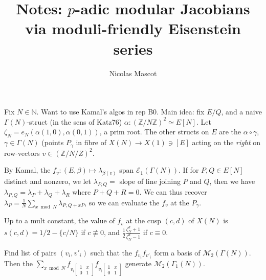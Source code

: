 \documentclass[12pt]{article}
\title{Notes: $p$-adic modular Jacobians via moduli-friendly Eisenstein series}
\author{Nicolas Mascot}
\newcommand{\N}{\mathbb{N}}
\newcommand{\Z}{\mathbb{Z}}
\newcommand{\M}{\mathcal{M}}
\newcommand{\E}{\mathcal{E}}
\newcommand{\smat}[4]{\left[ \begin{smallmatrix} #1 & #2 \\ #3 & #4 \end{smallmatrix} \right]}
\theoremstyle{definition}
\begin{document}
Fix $N \in \N$. Want to use Kamal's algos in rep B0. Main idea: fix $E/Q$, and a naive $\Gamma(N)$-struct (in the sens of Katz76) $\alpha: (\Z/N\Z)^2 \simeq E[N]$. Let $\zeta_N = e_N(\alpha(1,0),\alpha(0,1))$, a prim root. The other structs on $E$ are the $\alpha \circ \gamma$, $\gamma \in \Gamma(N)$ (points $P_\gamma$ in fibre of $X(N) \longrightarrow X(1) \ni [E]$ acting on the \emph{right} on row-vectors $v \in (\Z/N/Z)^2$.

By Kamal, the $f_v : (E,\beta) \mapsto \lambda_{\beta(v)}$ span $\E_1(\Gamma(N))$. If for $P,Q \in E[N]$ distinct and nonzero, we let $\lambda_{P,Q} = $ slope of line joining $P$ and $Q$, then we have $\lambda_{P,Q} = \lambda_P + \lambda_{Q} + \lambda_{R}$ where $P+Q+R=0$. We can thus recover $\lambda_P = \frac1N \sum_{x \bmod N} \lambda_{P,Q+xP}$, so we can evaluate the $f_v$ at the $P_\gamma$.

Up to a mult constant, the value of $f_v$ at the cusp $(c,d)$ of $X(N)$ is $s(c,d) = 1/2 - \{c/N\}$ if $c \not \equiv 0$, and $\frac12 \frac{\zeta_N^d+1}{\zeta_N^d-1}$ if $c \equiv 0$.

Find list of pairs $(v_i,v'_i)$ such that the $f_{v_i} f_{v'_i}$ form a basis of $\M_2(\Gamma(N))$. Then the $\sum_{x \bmod N} f_{v_i \smat{1}{x}{0}{1}} f_{v_i \smat{1}{x}{0}{1}}$ generate $\M_2(\Gamma_1(N))$.
\end{document}
